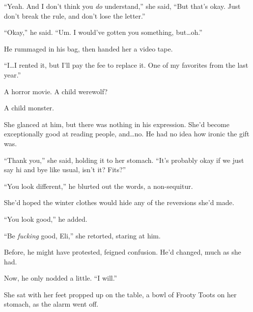 ``Yeah.  And I don't think you \emph{do }understand,'' she said, ``But that's okay.  Just don't break the rule, and don't lose the letter.''



``Okay,'' he said.  ``Um.  I would've gotten you something, but\ldots oh.''



He rummaged in his bag, then handed her a video tape.



``I\ldots I rented it, but I'll pay the fee to replace it.  One of my favorites from the last year.''



A horror movie.  A child werewolf?



A child monster.



She glanced at him, but there was nothing in his expression.  She'd become exceptionally good at reading people, and\ldots no.  He had no idea how ironic the gift was.



``Thank you,'' she said, holding it to her stomach.  ``It's probably okay if we just say hi and bye like usual, isn't it?  Fits?''



``You look different,'' he blurted out the words, a non-sequitur.



She'd hoped the winter clothes would hide any of the reversions she'd made.



``You look good,'' he added.



``Be \emph{fucking} good, Eli,'' she retorted, staring at him.



Before, he might have protested, feigned confusion.  He'd changed, much as she had.



Now, he only nodded a little.  ``I will.''



\blacksquare






She sat with her feet propped up on the table, a bowl of Frooty Toots on her stomach, as the alarm went off.



